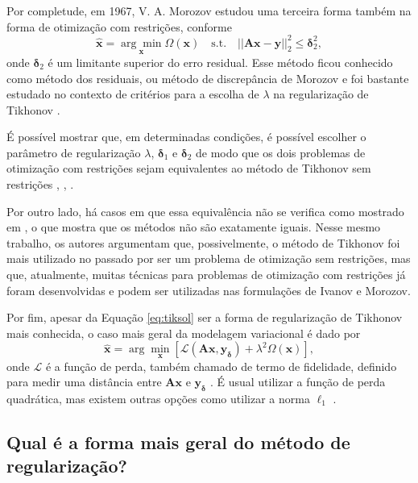 Por completude, em 1967, V. A. Morozov estudou uma terceira forma também na forma de otimização com restrições, conforme
\begin{equation}
\hat{\mathbf{x}} = \underset{\mathbf{x}}{\arg\min}\Omega(\mathbf{x}) \quad \text{s.t.} \quad \vert \vert \mathbf{A}\mathbf{x} - \mathbf{y} \vert \vert^2_2 \leq \bm{\delta}^2_2,
\label{eq:morozov}
\end{equation}
onde $\bm{\delta}_2$ é um limitante superior do erro residual. Esse método ficou conhecido como método dos residuais, ou método de discrepância de Morozov e foi bastante estudado no contexto de critérios para a escolha de $\lambda$ na regularização de Tikhonov \cite[págs. X, 32]{Morozov1984}. 

É possível mostrar que, em determinadas condições, é possível escolher o parâmetro de regularização $\lambda$, $\bm{\delta}_1$ e $\bm{\delta}_2$ de modo que os dois problemas de otimização com restrições sejam equivalentes ao método de Tikhonov sem restrições \cite[págs. 2793-4, definição 6]{Chen2002}, \cite[págs. 63-4]{hansen2010discrete}, \cite{Oneto2016}. 

Por outro lado, há casos em que essa equivalência não se verifica como mostrado em \cite{Kaltenbacher2018}, o que mostra que os métodos não são exatamente iguais. Nesse mesmo trabalho, os autores argumentam que, possivelmente, o método de Tikhonov foi mais utilizado no passado por ser um problema de otimização sem restrições, mas que, atualmente, muitas técnicas para problemas de otimização com restrições já foram desenvolvidas e podem ser utilizadas nas formulações de Ivanov e Morozov. 

Por fim, apesar da Equação \eqref{eq:tiksol} ser a forma de regularização de Tikhonov mais conhecida, o caso mais geral da modelagem variacional é dado por 
\begin{equation}
\hat{\mathbf{x}} = \arg\min\limits_{\mathbf{x}} \left[ \mathcal{L}(\mathbf{A}\mathbf{x}, \mathbf{y}_{\bm{\delta}}) + \lambda^2 \Omega(\mathbf{x}) \right],
\label{eq:tikhonovgen}
\end{equation}
onde $\mathcal{L}$ é a função de perda, também chamado de termo de fidelidade, definido para medir uma distância entre $\mathbf{A}\mathbf{x}$ e $\mathbf{y}_{\bm{\delta}}$ \cite{Benning2018}. É usual utilizar a função de perda quadrática, mas existem outras opções como utilizar a norma $\ell_1$ \cite{Bertero2021}. 

\subsection{Qual é a forma mais geral do método de regularização?} \label{sec:abstractmethod}

